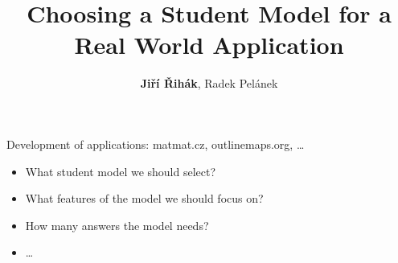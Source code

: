 \documentclass[xcolor=svgnames]{beamer}
\title[Choosing a Student Model for a Real World
Application]{Choosing a Student Model for a Real World
Application}
\author{\textbf{Ji\v{r}í \v{R}ihák}, Radek Pelánek}
\institute{Masaryk University Brno}
\date{}
\begin{document}
\frame[plain]{\titlepage}
\begin{frame}
    Development of applications: matmat.cz, outlinemaps.org, \dots
    \begin{itemize}
        \item What student model we should select?
        \item What features of the model we should focus on?
        \item How many answers the model needs?
        \item \dots
    \end{itemize}
\end{frame}
\end{document}

